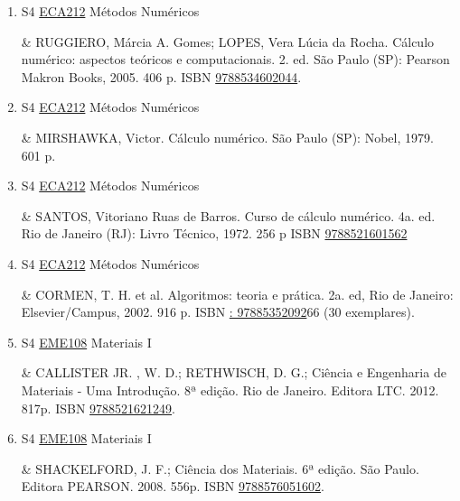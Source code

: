 \documentclass[12pt,a4paper]{book}
\begin{document}
\begin{enumerate}
 \item S4 \hyperref[PUD:ECA212]{ECA212} Métodos Numéricos

&  RUGGIERO, Márcia A.  Gomes;  LOPES, Vera Lúcia da Rocha.  Cálculo numérico: aspectos teóricos e computacionais.  2. ed.  São Paulo (SP): Pearson Makron Books, 2005.  406 p.  ISBN \href{http://www.bn.br/site/pages/servicosProfissionais/agenciaISBN/isbnBusca/FbnBuscaISBNCatalogo.asp?pField=ISBN&pIntPagina=1&pISBN=34602044&nidbISBN=true&hidbISBN=true}{9788534602044}.
 \item S4 \hyperref[PUD:ECA212]{ECA212} Métodos Numéricos

&  MIRSHAWKA, Victor.  Cálculo numérico.  São Paulo (SP): Nobel, 1979.  601 p. 
 

 \item S4 \hyperref[PUD:ECA212]{ECA212} Métodos Numéricos

&  SANTOS, Vitoriano Ruas de Barros.  Curso de cálculo numérico.  4a.  ed.  Rio de Janeiro (RJ): Livro Técnico, 1972.  256 p ISBN \href{http://www.bn.br/site/pages/servicosProfissionais/agenciaISBN/isbnBusca/FbnBuscaISBNCatalogo.asp?pField=ISBN&pIntPagina=1&pISBN=21601562&nidbISBN=true&hidbISBN=true}{9788521601562}
 

 \item S4 \hyperref[PUD:ECA212]{ECA212} Métodos Numéricos

& CORMEN, T.  H.  et al.  Algoritmos: teoria e prática.  2a.  ed, Rio de Janeiro: Elsevier/Campus, 2002.  916 p.  ISBN \href{http://www.google.com/search?hl=pt-BR&tbo=p&tbm=bks&q=isbn:: 97885352092&num=10}{: 97885352092}66  (30 exemplares).
 \item S4 \hyperref[PUD:EME108]{EME108} Materiais I

& CALLISTER JR. , W.  D.;  RETHWISCH, D.  G.;  Ciência e Engenharia de Materiais - Uma Introdução.  8ª edição.  Rio de Janeiro.  Editora LTC.  2012.  817p.  ISBN \href{http://www.bn.br/site/pages/servicosProfissionais/agenciaISBN/isbnBusca/FbnBuscaISBNCatalogo.asp?pField=ISBN&pIntPagina=1&pISBN=21621249&nidbISBN=true&hidbISBN=true}{9788521621249}. 
 

 \item S4 \hyperref[PUD:EME108]{EME108} Materiais I

& SHACKELFORD, J.  F.;  Ciência dos Materiais.  6ª edição.  São Paulo.  Editora PEARSON.  2008.  556p.  ISBN \href{http://www.bn.br/site/pages/servicosProfissionais/agenciaISBN/isbnBusca/FbnBuscaISBNCatalogo.asp?pField=ISBN&pIntPagina=1&pISBN=76051602&nidbISBN=true&hidbISBN=true}{9788576051602}. 
 


\end{enumerate}
\end{document}
